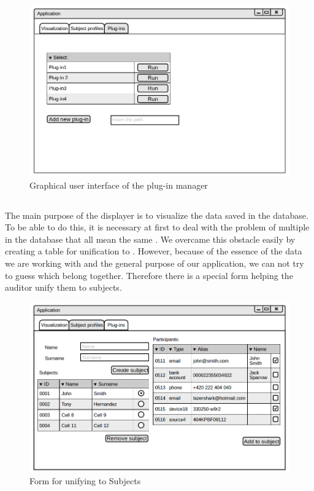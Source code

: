 \begin{figure}[h]
	\begin{center} 
	\includegraphics[width=1.0\textwidth]{./img/GUI/Plug-ins.png}
	\end{center}
	\caption{Graphical user interface of the plug-in manager}\label{plug-ins}
\end{figure}

\subsection{}

The main purpose of the displayer is to visualize the data saved in the database. To be able to do this, it is necessary at first to deal with the problem of multiple  in the database that all mean the same . We overcame this obstacle easily by creating a table for  unification to . However, because of the essence of the data we are working with and the general purpose of our application, we can not try to guess which  belong together. Therefore there is a special form helping the auditor unify them to subjects. 

\begin{figure}[h]
	\begin{center} 
	\includegraphics[width=1.0\textwidth]{./img/GUI/Subject_profiles.png}
	\end{center}
	\caption{Form for unifying  to Subjects}\label{form}
\end{figure}

